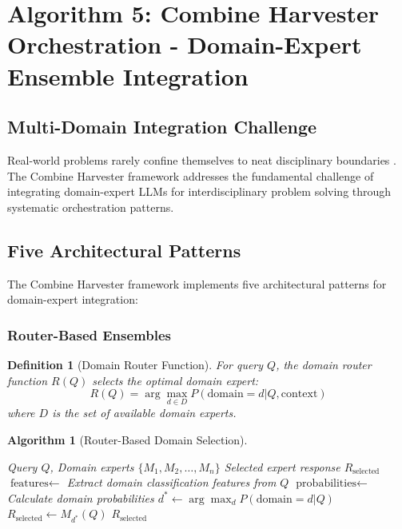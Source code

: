 \documentclass[12pt,a4paper]{article}
\newtheorem{definition}[theorem]{Definition}
\newtheorem{algorithm}[theorem]{Algorithm}
\begin{document}
\section{Algorithm 5: Combine Harvester Orchestration - Domain-Expert Ensemble Integration}

\subsection{Multi-Domain Integration Challenge}

Real-world problems rarely confine themselves to neat disciplinary boundaries \citep{smith2023domain}. The Combine Harvester framework addresses the fundamental challenge of integrating domain-expert LLMs for interdisciplinary problem solving through systematic orchestration patterns.

\subsection{Five Architectural Patterns}

The Combine Harvester framework implements five architectural patterns for domain-expert integration:

\subsubsection{Router-Based Ensembles}

\begin{definition}[Domain Router Function]
For query $Q$, the domain router function $R(Q)$ selects the optimal domain expert:
\begin{equation}
R(Q) = \arg\max_{d \in D} P(\text{domain}=d | Q, \text{context})
\end{equation}
where $D$ is the set of available domain experts.
\end{definition}

\begin{algorithm}[Router-Based Domain Selection]
\begin{algorithmic}[1]
\REQUIRE Query $Q$, Domain experts $\{M_1, M_2, \ldots, M_n\}$
\ENSURE Selected expert response $R_{\text{selected}}$
\STATE $\text{features} \leftarrow$ Extract domain classification features from $Q$
\STATE $\text{probabilities} \leftarrow$ Calculate domain probabilities
\STATE $d^* \leftarrow \arg\max_d P(\text{domain}=d | Q)$
\STATE $R_{\text{selected}} \leftarrow M_{d^*}(Q)$
\RETURN $R_{\text{selected}}$
\end{algorithmic}
\end{algorithm}
\end{document}
